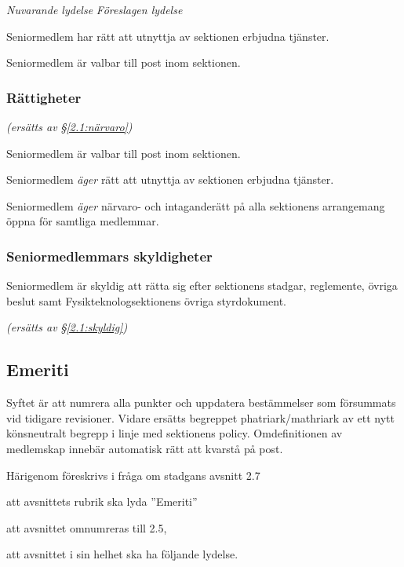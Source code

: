\documentclass{article}
\newenvironment{lydelse}
    {\begin{paracol}{2}%
        \emph{Nuvarande lydelse}%
        \switchcolumn%
        \emph{Föreslagen lydelse}%
    \end{paracol}%
    \begin{enumerate}[label=\thesubsection.\arabic*]%
    \begin{paracol}{2}%
    }{\end{paracol}\end{enumerate}}
\newcommand{\itemb}{\item[\textbullet]}
\begin{document}
\begin{lydelse}
  \itemb Seniormedlem har rätt att utnyttja av sektionen erbjudna
   tjänster.
   
  \itemb Seniormedlem är valbar till post inom sektionen.
    
\switchcolumn
    \subsubsection*{Rättigheter}%
    \emph{(ersätts av \S \ref{2.1:närvaro})}
    
    \item Seniormedlem är valbar till post inom sektionen.
    
    \item Seniormedlem \emph{äger} rätt att utnyttja av sektionen erbjudna
   tjänster.
   
   \item Seniormedlem \emph{äger} närvaro- och intaganderätt på alla sektionens
arrangemang öppna för samtliga medlemmar.

\switchcolumn*
    \subsubsection*{Seniormedlemmars skyldigheter}%
    \itemb Seniormedlem är skyldig att rätta sig efter sektionens stadgar,
  regle\-mente, övriga beslut samt  Fysikteknologsektionens övriga styrdokument.
    
\switchcolumn
    \emph{(ersätts av \S \ref{2.1:skyldig})}
\end{lydelse}

\subsection{Emeriti}
Syftet är att numrera alla punkter och uppdatera bestämmelser som försummats vid tidigare revisioner.
Vidare ersätts begreppet phatriark/mathriark av ett nytt könsneutralt begrepp i linje med sektionens policy.
Omdefinitionen av medlemskap innebär automatisk rätt att kvarstå på post.

Härigenom föreskrivs i fråga om stadgans avsnitt 2.7
\begin{dels}
    \item att avsnittets rubrik ska lyda ''Emeriti''
    \item att avsnittet omnumreras till 2.5,
    \item att avsnittet i sin helhet ska ha följande lydelse.
\end{dels}
\end{document}
